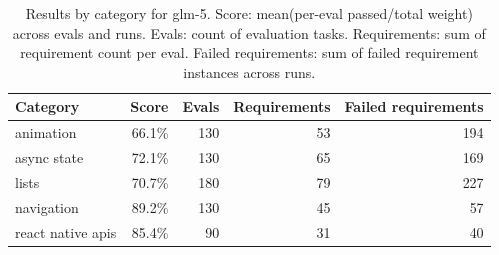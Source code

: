\begin{table}[htbp]
\centering
\begin{tabular}{lrrrr}
\toprule
Category & Score & Evals & Requirements & Failed requirements \\
\midrule
animation & 66.1\% & 130 & 53 & 194 \\
async state & 72.1\% & 130 & 65 & 169 \\
lists & 70.7\% & 180 & 79 & 227 \\
navigation & 89.2\% & 130 & 45 & 57 \\
react native apis & 85.4\% & 90 & 31 & 40 \\
\bottomrule
\end{tabular}
\caption{Results by category for glm-5. Score: mean(per-eval passed/total weight) across evals and runs. Evals: count of evaluation tasks. Requirements: sum of requirement count per eval. Failed requirements: sum of failed requirement instances across runs.}
\end{table}
